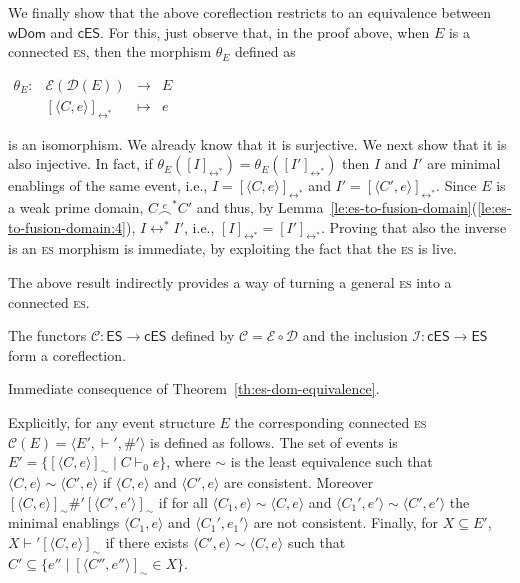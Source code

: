 \documentclass[conference]{IEEEtran}
\renewenvironment{proof}{\begin{IEEEproof}}{\end{IEEEproof}}
\newcommand{\esabbr}{\textsc{es}}
\newcommand{\esir}[2]{\ensuremath{\langle{#1}, {#2}\rangle}}
\newcommand{\eqclass}[2][]{\ensuremath{[{#2}]_{\scriptscriptstyle {#1}}}}
\newcommand{\eqclassir}[1]{\ensuremath{\eqclass[\leftrightarrow^*]{#1}}}
\newcommand{\es}{\ensuremath{\mathsf{ES}}}
\newcommand{\ces}{\ensuremath{\mathsf{cES}}}
\newcommand{\WDom}{\ensuremath{\mathsf{wDom}}}
\newcommand{\zev}[0]{\ensuremath{\mathcal{E}}}
\newcommand{\ev}[1]{\ensuremath{\zev({#1})}}
\newcommand{\zconnes}[0]{\ensuremath{\mathcal{C}}}
\newcommand{\zinces}[0]{\ensuremath{\mathcal{I}}}
\newcommand{\conn}[1]{\ensuremath{\stackrel{#1}{\frown}}}
\newcommand{\zdom}[0]{\ensuremath{\mathcal{D}}}
\newcommand{\dom}[1]{\ensuremath{\zdom({#1})}}
\begin{document}
\begin{proof}
%
  We finally show that the above coreflection restricts to an
  equivalence between $\WDom$ and $\ces$.
  For this, just observe that, in the proof above, when ${E}$ is a connected
  {\esabbr}, then the morphism $\theta_{E}$ defined as
  \begin{center}
    $\begin{array}{lccc}
       \theta_{{E}} : & \ev{\dom{{E}}} &  \to & {E}\\
                             & \eqclassir{\esir{C}{e}} & \mapsto & e
     \end{array}
     $
  \end{center}
  is an isomorphism. We already know that
  it is surjective. We next show that it is also injective. In fact, if
  $\theta_{{E}}(\eqclassir{I}) =
  \theta_{{E}}(\eqclassir{I'})$
  then $I$ and $I'$ are minimal enablings of the same event, i.e.,
  $I = \eqclassir{\esir{C}{e}}$ and $I' = \eqclassir{\esir{C'}{e}}$. Since
  ${E}$ is a weak prime domain, $C \conn{e}^* C'$ and thus, by
  Lemma~\ref{le:es-to-fusion-domain}(\ref{le:es-to-fusion-domain:4}), $I \leftrightarrow^* I'$,
  i.e., $\eqclassir{I} =\eqclassir{I'}$.
  Proving that also the inverse is an {\esabbr} morphism is immediate, by
  exploiting the fact that the {\esabbr} is live.
\end{proof}

The above result indirectly provides a way of turning a general
{\esabbr} into a connected {\esabbr}.

\begin{corollary}[from general to connected {\esabbr}]
  The functors $\zconnes : \es \to \ces$ defined by
  $\zconnes = \zev \circ \zdom$ and the inclusion
  $\zinces : \ces \to \es$ form a coreflection.
\end{corollary}

\begin{proof}
  Immediate consequence of Theorem~\ref{th:es-dom-equivalence}.
\end{proof}

Explicitly, for any event structure $E$ the corresponding connected {\esabbr} 
$\zconnes(E) = \langle E', \vdash', \#' \rangle$ is defined as follows. 
The set of events is $E' = \{ \eqclass[\sim]{\esir{C}{e}} \mid C \vdash_0 e \}$, 
where $\sim$ is the least equivalence such that $\esir{C}{e} \sim \esir{C'}{e}$ 
if $\esir{C}{e}$ and $\esir{C'}{e}$ are consistent. 
%
Moreover $\eqclass[\sim]{\esir{C}{e}} \#' \eqclass[\sim]{\esir{C'}{e'}}$ if for all 
$\esir{C_1}{e} \sim \esir{C}{e}$ and $\esir{C_1'}{e'} \sim \esir{C'}{e'}$ the 
minimal enablings $\esir{C_1}{e}$ and $\esir{C_1'}{e_1'}$ are not consistent. 
Finally, for $X \subseteq E'$, $X \vdash' \eqclass[\sim]{\esir{C}{e}}$ if there 
exists $\esir{C'}{e} \sim \esir{C}{e}$ such that 
$C' \subseteq \{ e'' \mid \eqclass[\sim]{\esir{C''}{e''}} \in X\}$.
\end{document}
